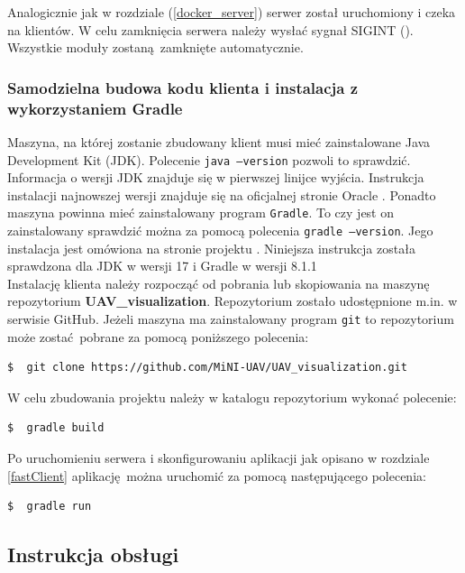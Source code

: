 \documentclass[15pt]{sprawozdanie}
\begin{document}
Analogicznie jak w rozdziale (\ref{docker_server}) serwer został uruchomiony i czeka na klientów. W celu zamknięcia serwera należy wysłać sygnał SIGINT (). Wszystkie moduły zostaną zamknięte automatycznie.

\subsubsection{Samodzielna budowa kodu klienta i instalacja z wykorzystaniem Gradle}
 
Maszyna, na której zostanie zbudowany klient musi mieć zainstalowane Java Development Kit (JDK). Polecenie \texttt{java --version} pozwoli to sprawdzić. Informacja o wersji JDK znajduje się w pierwszej linijce wyjścia. Instrukcja instalacji najnowszej wersji znajduje się na oficjalnej stronie Oracle \cite{javaDown}. Ponadto maszyna powinna mieć zainstalowany program \texttt{Gradle}. To czy jest on zainstalowany sprawdzić można za pomocą polecenia \texttt{gradle --version}. Jego instalacja jest omówiona na stronie projektu \cite{gradle}. Niniejsza instrukcja została sprawdzona dla JDK w wersji 17 i Gradle w wersji 8.1.1 \\


Instalację klienta należy rozpocząć od pobrania lub skopiowania na maszynę repozytorium \textbf{UAV\_visualization}. Repozytorium zostało udostępnione m.in. w serwisie GitHub. Jeżeli maszyna ma zainstalowany program \texttt{git} to repozytorium może zostać pobrane za pomocą poniższego polecenia:

\begin{lstlisting}[language=bash]
  $  git clone https://github.com/MiNI-UAV/UAV_visualization.git 
\end{lstlisting}

W celu zbudowania projektu należy w katalogu repozytorium wykonać polecenie:

\begin{lstlisting}[language=bash]
  $  gradle build
\end{lstlisting} 

Po uruchomieniu serwera i skonfigurowaniu aplikacji jak opisano w rozdziale \ref{fastClient} aplikację można uruchomić za pomocą następującego polecenia:

\begin{lstlisting}[language=bash]
  $  gradle run 
\end{lstlisting}  

\newpage

\subsection{Instrukcja obsługi} \label{manual}
\end{document}

